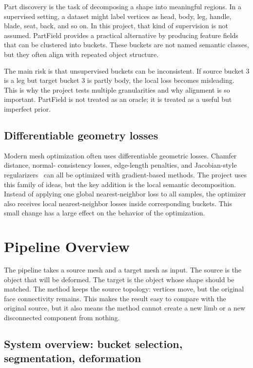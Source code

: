 \documentclass{article}
\begin{document}
Part discovery is the task of decomposing a shape into meaningful regions. In a supervised setting,
a dataset might label vertices as head, body, leg, handle, blade, seat, back, and so on. In this
project, that kind of supervision is not assumed. PartField provides a practical alternative by
producing feature fields that can be clustered into buckets. These buckets are not named semantic
classes, but they often align with repeated object structure.

The main risk is that unsupervised buckets can be inconsistent. If source bucket 3 is a leg but
target bucket 3 is partly body, the local loss becomes misleading. This is why the project tests
multiple granularities and why alignment is so important. PartField is not treated as an oracle; it
is treated as a useful but imperfect prior.

\subsection{Differentiable geometry losses}

Modern mesh optimization often uses differentiable geometric losses. Chamfer distance, normal-
consistency losses, edge-length penalties, and Jacobian-style regularizers~\cite{arap,njf} can all
be optimized with gradient-based methods. The project uses this family of ideas, but the key
addition is the local semantic decomposition. Instead of applying one global nearest-neighbor loss
to all samples, the optimizer also receives local nearest-neighbor losses inside corresponding
buckets. This small change has a large effect on the behavior of the optimization.

\section{Pipeline Overview}

The pipeline takes a source mesh and a target mesh as input. The source is the object that will be
deformed. The target is the object whose shape should be matched. The method keeps the source
topology: vertices move, but the original face connectivity remains. This makes the result easy to
compare with the original source, but it also means the method cannot create a new limb or a new
disconnected component from nothing.

\subsection{System overview: bucket selection, segmentation, deformation}
\label{sec:system-overview}
\end{document}
